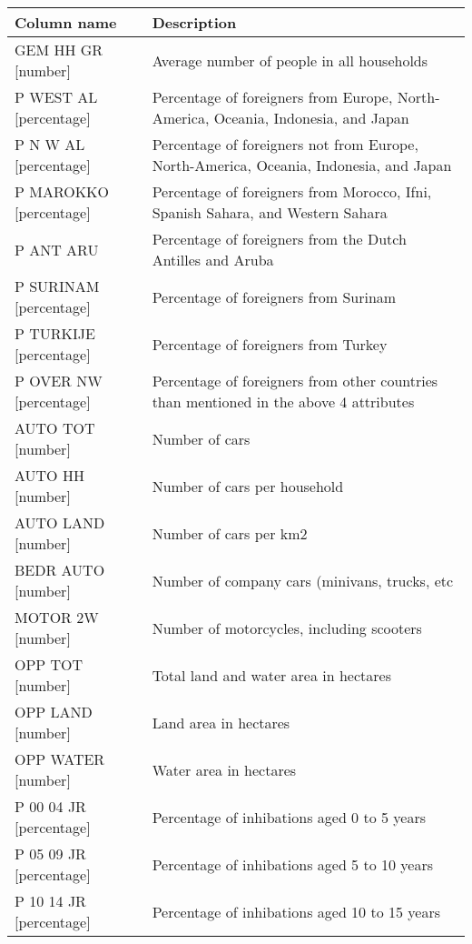 \documentclass[a4paper,twoside,11pt]{article}
\begin{document}
\begin{center}
    \begin{tabular}{ | p{4.9cm} | p{10cm} |}
    \hline
    \textbf{Column name} & \textbf{Description} \\ \hline
        GEM HH GR [number] & Average number of people in all households \\ \hline
        P WEST AL [percentage] & Percentage of foreigners from Europe, North-America, Oceania, Indonesia, and Japan \\ \hline
        P N W AL [percentage] & Percentage of foreigners not from Europe, North-America, Oceania, Indonesia, and Japan \\ \hline
        P MAROKKO [percentage] & Percentage of foreigners from Morocco, Ifni, Spanish Sahara, and Western Sahara \\ \hline
        P ANT ARU & Percentage of foreigners from the Dutch Antilles and Aruba \\ \hline
        P SURINAM [percentage] & Percentage of foreigners from Surinam \\ \hline
        P TURKIJE [percentage] & Percentage of foreigners from Turkey \\ \hline
        P OVER NW [percentage] & Percentage of foreigners from other countries than mentioned in the above 4 attributes \\ \hline
        AUTO TOT [number] & Number of cars \\ \hline
        AUTO HH [number] & Number of cars per household \\ \hline
        AUTO LAND [number] & Number of cars per km2 \\ \hline
        BEDR AUTO [number] & Number of company cars (minivans, trucks, etc \\ \hline
        MOTOR 2W [number] & Number of motorcycles, including scooters \\ \hline
        OPP TOT [number] & Total land and water area in hectares \\ \hline
        OPP LAND [number] & Land area in hectares \\ \hline
        OPP WATER [number] & Water area in hectares \\ \hline
        P 00 04 JR [percentage] & Percentage of inhibations aged 0 to 5 years \\ \hline
        P 05 09 JR [percentage] & Percentage of inhibations aged 5 to 10 years \\ \hline
        P 10 14 JR [percentage] & Percentage of inhibations aged 10 to 15 years \\ \hline

\end{tabular}
\end{center}
\end{document}
